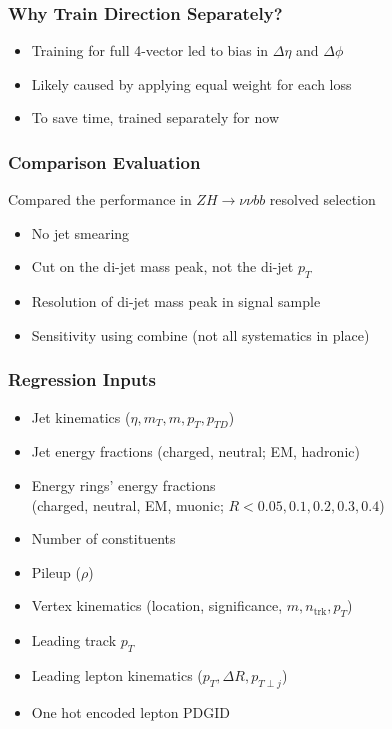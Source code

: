 \documentclass{beamer}
\begin{document}
\begin{frame}
  \frametitle{Why Train Direction Separately?}

  \begin{itemize}
  \item Training for full 4-vector led to bias in
    $\Delta \eta$ and $\Delta \phi$ 
  \item Likely caused by applying equal weight for each loss
  \item To save time, trained separately for now
  \end{itemize}


\end{frame}

\begin{frame}
  \frametitle{Comparison Evaluation}

  Compared the performance in $ZH \rightarrow \nu\nu bb$ resolved selection

  \begin{itemize}
  \item No jet smearing
  \item Cut on the di-jet mass peak, not the di-jet $p_T$
  \item Resolution of di-jet mass peak in signal sample
  \item Sensitivity using combine (not all systematics in place)
  \end{itemize}

\end{frame}

\begin{frame}
  \frametitle{Regression Inputs}

  \begin{itemize}
  \item Jet kinematics ($\eta, m_T, m, p_T, p_{TD}$)
  \item Jet energy fractions (charged, neutral; EM, hadronic)
  \item Energy rings' energy fractions \\
    (charged, neutral, EM, muonic; $R < 0.05, 0.1, 0.2, 0.3, 0.4$)
  \item Number of constituents
  \item Pileup ($\rho$)
  \item Vertex kinematics (location, significance, $m, n_\mathrm{trk}, p_T$)
  \item Leading track $p_T$
  \item Leading lepton kinematics ($p_T, \Delta R, p_{T\perp j}$)
  \item One hot encoded lepton PDGID
  \end{itemize}

\end{frame}
\end{document}
